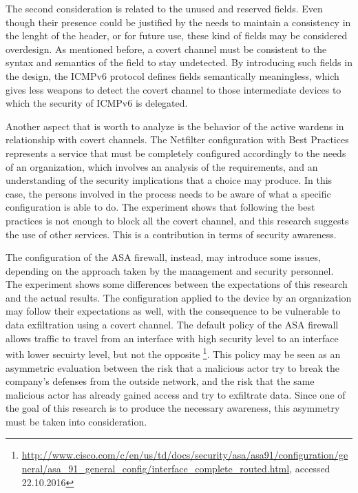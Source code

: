 \documentclass[12pt]{article}
\begin{document}
The second consideration is related to the unused and reserved fields. Even though their presence could be justified by the needs to maintain a consistency in the lenght of the header, or for future use, these kind of fields may be considered overdesign. As mentioned before, a covert channel must be consistent to the syntax and semantics of the field to stay undetected. By introducing such fields in the design, the ICMPv6 protocol defines fields semantically meaningless, which gives less weapons to detect the covert channel to those intermediate devices to which the security of ICMPv6 is delegated.

Another aspect that is worth to analyze is the behavior of the active wardens in relationship with covert channels. The Netfilter configuration with Best Practices represents a service that must be completely configured accordingly to the needs of an organization, which involves an analysis of the requirements, and an understanding of the security implications that a choice may produce. In this case, the persons involved in the process needs to be aware of what a specific configuration is able to do. The experiment shows that following the best practices is not enough to block all the covert channel, and this research suggests the use of other services. This is a contribution in terms of security awareness.

The configuration of the ASA firewall, instead, may introduce some issues, depending on the approach taken by the management and security personnel. The experiment shows some differences between the expectations of this research and the actual results. The configuration applied to the device by an organization may follow their expectations as well, with the consequence to be vulnerable to data exfiltration using a covert channel. The default policy of the ASA firewall allows traffic to travel from an interface with high security level to an interface with lower secuirty level, but not the opposite \footnote{\url{http://www.cisco.com/c/en/us/td/docs/security/asa/asa91/configuration/general/asa_91_general_config/interface_complete_routed.html}, accessed 22.10.2016}. This policy may be seen as an asymmetric evaluation between the risk that a malicious actor try to break the company's defenses from the outside network, and the risk that the same malicious actor has already gained access and try to exfiltrate data. Since one of the goal of this research is to produce the necessary awareness, this asymmetry must be taken into consideration.
\end{document}
